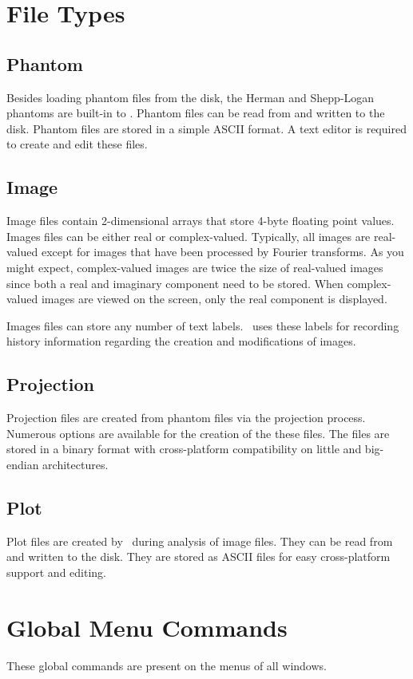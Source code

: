 \section{File Types}

\subsection{Phantom}
Besides loading phantom files from the disk, the Herman\cite{HERMAN80} and
Shepp-Logan\cite{SHEPP74} phantoms are built-in to \ctsim. Phantom files can be
read from and written to the disk. Phantom files are stored in a simple
ASCII format. A text editor is required to
create and edit these files.

\subsection{Image}
Image files contain 2-dimensional arrays that store 4-byte floating
point values. Images files can be either real or complex-valued.
Typically, all images are real-valued except for images that have been
processed by Fourier transforms. As you might expect,
complex-valued images are twice the size of real-valued images
since both a real and imaginary component need to be stored. When
complex-valued images are viewed on the screen, only the real
component is displayed.

Images files can    store any number of text labels. \ctsim\ uses
these labels for recording history information regarding
the creation and modifications of images.

\subsection{Projection}
Projection files are created from phantom files via the
projection process. Numerous options are available for the
creation of the these files. The files are stored in a binary
format with cross-platform compatibility on little and big-endian
architectures.

\subsection{Plot}
Plot files are created by \ctsim\ during analysis of image files.
They can be read from and written to the disk. They are stored as ASCII
files for easy cross-platform support and editing.

\section{Global Menu Commands}
These global commands are present on the menus of all windows.

